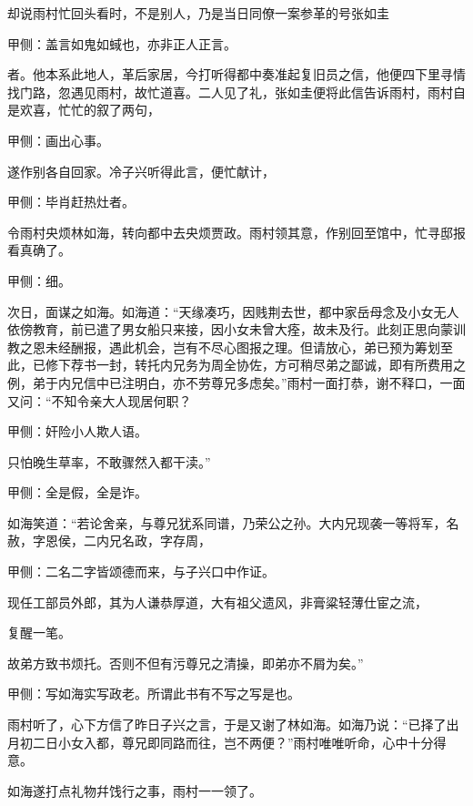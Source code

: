 \begin{parag}
    却说雨村忙回头看时，不是别人，乃是当日同僚一案参革的号张如圭\begin{note}甲侧：盖言如鬼如蜮也，亦非正人正言。\end{note}者。他本系此地人，革后家居，今打听得都中奏准起复旧员之信，他便四下里寻情找门路，忽遇见雨村，故忙道喜。二人见了礼，张如圭便将此信告诉雨村，雨村自是欢喜，忙忙的叙了两句，\begin{note}甲侧：画出心事。\end{note}遂作别各自回家。冷子兴听得此言，便忙献计，\begin{note}甲侧：毕肖赶热灶者。\end{note}令雨村央烦林如海，转向都中去央烦贾政。雨村领其意，作别回至馆中，忙寻邸报看真确了。\begin{note}甲侧：细。\end{note}次日，面谋之如海。如海道：“天缘凑巧，因贱荆去世，都中家岳母念及小女无人依傍教育，前已遣了男女船只来接，因小女未曾大痊，故未及行。此刻正思向蒙训教之恩未经酬报，遇此机会，岂有不尽心图报之理。但请放心，弟已预为筹划至此，已修下荐书一封，转托内兄务为周全协佐，方可稍尽弟之鄙诚，即有所费用之例，弟于内兄信中已注明白，亦不劳尊兄多虑矣。”雨村一面打恭，谢不释口，一面又问：“不知令亲大人现居何职？\begin{note}甲侧：奸险小人欺人语。\end{note}只怕晚生草率，不敢骤然入都干渎。”\begin{note}甲侧：全是假，全是诈。\end{note}如海笑道：“若论舍亲，与尊兄犹系同谱，乃荣公之孙。大内兄现袭一等将军，名赦，字恩侯，二内兄名政，字存周，\begin{note}甲侧：二名二字皆颂德而来，与子兴口中作证。\end{note}现任工部员外郎，其为人谦恭厚道，大有祖父遗风，非膏粱轻薄仕宦之流，\begin{note}复醒一笔。\end{note}故弟方致书烦托。否则不但有污尊兄之清操，即弟亦不屑为矣。”\begin{note}甲侧：写如海实写政老。所谓此书有不写之写是也。\end{note}雨村听了，心下方信了昨日子兴之言，于是又谢了林如海。如海乃说：“已择了出月初二日小女入都，尊兄即同路而往，岂不两便？”雨村唯唯听命，心中十分得意。
\end{parag}


\begin{parag}
    如海遂打点礼物幷饯行之事，雨村一一领了。
\end{parag}


